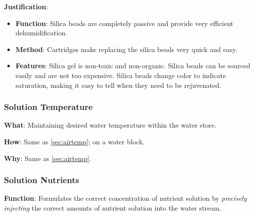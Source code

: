 \documentclass{report}
\begin{document}
\textbf{Justification}: 
\begin{itemize}
    \item \textbf{Function}: Silica beads are completely passive and provide very efficient dehumidification.
    \item \textbf{Method}: Cartridges make replacing the silica beads very quick and easy. 
    \item \textbf{Features}: Silica gel is non-toxic and non-organic. Silica beads can be sourced easily and are not too expensive. Silica beads change color to indicate saturation, making it easy to tell when they need to be rejuvenated.
\end{itemize}

\newpage



\subsubsection{Solution Temperature}
\label{sec:watertemp}

\textbf{What}: Maintaining desired water temperature within the water store.

\textbf{How}: Same as \ref{sec:airtemp}; on a water block.

\textbf{Why}: Same as \ref{sec:airtemp}.

\subsubsection{Solution Nutrients}
\label{sec:nutrients}

\textbf{Function}: Formulates the correct concentration of nutrient solution by \textit{precisely injecting} the correct amounts of nutrient solution into the water stream.
\end{document}
